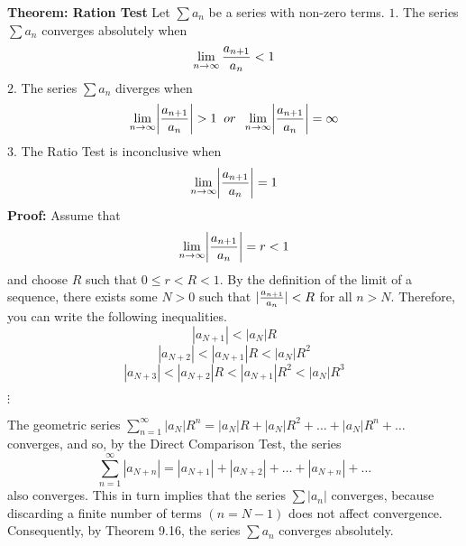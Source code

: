 \nopagenumbers
{\bf Theorem: Ration Test}
\vskip 6pt
Let $\sum a_n$ be a series with non-zero terms.
\vskip 12pt
$1.$ The series $\sum a_n$ converges absolutely when $$\lim_{n\to\infty}{a_{n+1}\over a_n}<1$$
\vskip 1mm
$2.$ The series $\sum a_n$ diverges when $$\lim_{n\to\infty}\biggl|{a_{n+1}\over a_n}\biggr|>1 \;\; or \;\; \lim_{n\to\infty}\biggl|{a_{n+1}\over a_n}\biggr|=\infty$$
\vskip 1mm
$3.$ The Ratio Test is inconclusive when $$\lim_{n\to\infty}\biggl|{a_{n+1}\over a_n}\biggr|=1$$
\vskip 10pt
{\bf Proof:}
\vskip 6pt
Assume that $$\lim_{n\to\infty}\biggl|{a_{n+1}\over a_n}\biggr|=r<1$$ and choose $R$ such that $0\leq r<R<1$. By the definition of the limit of a sequence, there exists some $N>0$ such that $|{a_{n+1}\over a_n}|<R$ for all $n>N$. Therefore, you can write the following inequalities.
$$|a_{N+1}|<|a_N|R$$
$$|a_{N+2}|<|a_{N+1}|R<|a_N|R^2$$
$$|a_{N+3}|<|a_{N+2}|R<|a_{N+1}|R^2<|a_N|R^3$$
\centerline{$\vdots$}
\vskip 1mm
The geometric series $\sum_{n=1}^\infty |a_N|R^n=|a_N|R+|a_N|R^2+\ldots+|a_N|R^n+\ldots$ converges, and so, by the Direct Comparison Test, the series $$\sum_{n=1}^\infty|a_{N+n}|=|a_{N+1}|+|a_{N+2}|+\ldots+|a_{N+n}|+\ldots$$ also converges. This in turn implies that the series $\sum |a_n|$ converges, because discarding a finite number of terms $(n=N-1)$ does not affect convergence. Consequently, by Theorem 9.16, the series $\sum a_n$ converges absolutely.
\vfill\eject
